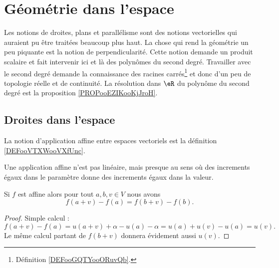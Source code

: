 

\section{Géométrie dans l'espace}

\begin{normaltext}
	Les notions de droites, plans et parallélisme sont des notions vectorielles qui auraient pu être traitées beaucoup plus haut. La chose qui rend la géométrie un peu piquante est la notion de perpendicularité. Cette notion demande un produit scalaire et fait intervenir ici et là des polynômes du second degré. Travailler avec le second degré demande la connaissance des racines carrés\footnote{Définition \ref{DEFooGQTYooORuvQb}.} et donc d'un peu de topologie réelle et de continuité. La résolution dans \( \eR\) du polynôme du second degré est la proposition \ref{PROPooEZIKooKjJroH}.
\end{normaltext}

\subsection{Droites dans l'espace}

La notion d'application affine entre espaces vectoriels est la définition \ref{DEFooVTXWooVXfUnc}.

Une application affine n'est pas linéaire, mais presque au sens où des increments égaux dans le paramètre donne des increments égaux dans la valeur.
\begin{lemma}       \label{LEMooEQEAooQaFCMW}
    Si \( f\) est affine alors pour tout \( a,b,v\in V\) nous avons
    \begin{equation}
        f(a+v)-f(a)=f(b+v)-f(b).
    \end{equation}
\end{lemma}

\begin{proof}
    Simple calcul :
    \begin{equation}
        f(a+v)-f(a)=u(a+v)+\alpha-u(a)-\alpha=u(a)+u(v)-u(a)=u(v).
    \end{equation}
    Le même calcul partant de \( f(b+v)\) donnera évidement aussi \( u(v)\).
\end{proof}


